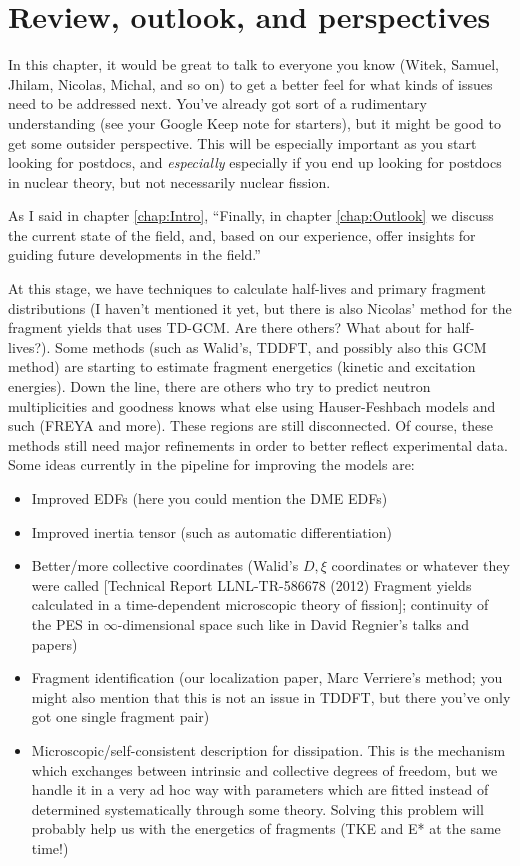 \section{Review, outlook, and perspectives}

In this chapter, it would be great to talk to everyone you know (Witek, Samuel, Jhilam, Nicolas, Michal, and so on) to get a better feel for what kinds of issues need to be addressed next. You've already got sort of a rudimentary understanding (see your Google Keep note for starters), but it might be good to get some outsider perspective. This will be especially important as you start looking for postdocs, and \textit{especially} especially if you end up looking for postdocs in nuclear theory, but not necessarily nuclear fission.

As I said in chapter \ref{chap:Intro}, ``Finally, in chapter \ref{chap:Outlook} we discuss the current state of the field, and, based on our experience, offer insights for guiding future developments in the field.''

At this stage, we have techniques to calculate half-lives and primary fragment distributions (I haven't mentioned it yet, but there is also Nicolas' method for the fragment yields that uses TD-GCM. Are there others? What about for half-lives?). Some methods (such as Walid's, TDDFT, and possibly also this GCM method) are starting to estimate fragment energetics (kinetic and excitation energies). Down the line, there are others who try to predict neutron multiplicities and goodness knows what else using Hauser-Feshbach models and such (FREYA and more). These regions are still disconnected. Of course, these methods still need major refinements in order to better reflect experimental data. Some ideas currently in the pipeline for improving the models are:

\begin{itemize}
	\item Improved EDFs (here you could mention the DME EDFs)
	\item Improved inertia tensor (such as automatic differentiation)
	\item Better/more collective coordinates (Walid's $D, \xi$ coordinates or whatever they were called [Technical Report LLNL-TR-586678 (2012) Fragment yields calculated in a time-dependent microscopic theory of fission]; continuity of the PES in $\infty$-dimensional space such like in David Regnier's talks and papers)
	\item Fragment identification (our localization paper, Marc Verriere's method; you might also mention that this is not an issue in TDDFT, but there you've only got one single fragment pair)
	\item Microscopic/self-consistent description for dissipation. This is the mechanism which exchanges between intrinsic and collective degrees of freedom, but we handle it in a very ad hoc way with parameters which are fitted instead of determined systematically through some theory. Solving this problem will probably help us with the energetics of fragments (TKE and E* at the same time!)
\end{itemize}

